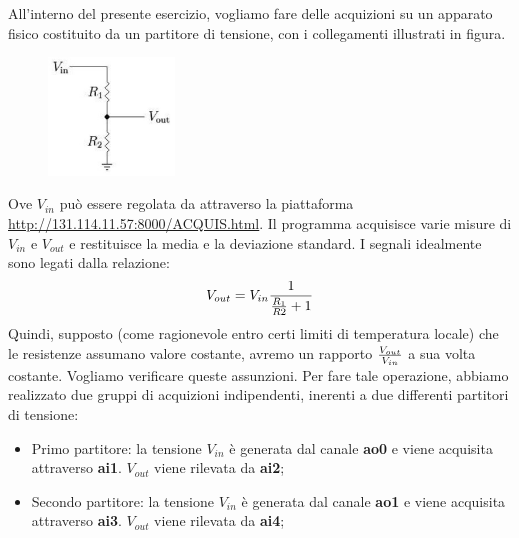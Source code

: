 All'interno del presente esercizio, vogliamo fare delle acquizioni su un apparato fisico costituito da un partitore di tensione, con i collegamenti illustrati in figura.
\begin{figure}
  \caption{}
    \includegraphics[width=0.3\textwidth]{settimana_1/immagini/partitore.jpg}
\end{figure}
Ove $V_{in}$ può essere regolata da  attraverso la piattaforma \textcolor{airforceblue}{\url{http://131.114.11.57:8000/ACQUIS.html}}. Il programma acquisisce varie misure di $V_{in}$ e $V_{out}$ e restituisce la media e la deviazione standard. I segnali idealmente sono legati dalla relazione:
\begin{equation}
    V_{out} = V_{in} {1 \over{{R_1\over{R2}} + 1}}
\label{eq1.2}
\end{equation} 
Quindi, supposto (come ragionevole entro certi limiti di temperatura locale) che le resistenze assumano valore costante, avremo un rapporto $V_{out} \over{V_{in}}$ a sua volta costante. Vogliamo verificare queste assunzioni. Per fare tale operazione, abbiamo realizzato due gruppi di acquizioni indipendenti, inerenti a due differenti partitori di tensione:
\begin{itemize}
    \item Primo partitore: la tensione  $V_{in}$ è generata dal canale \textbf{ao0} e viene acquisita attraverso \textbf{ai1}. $V_{out}$ viene rilevata da \textbf{ai2};
    \item Secondo partitore: la tensione  $V_{in}$ è generata dal canale \textbf{ao1} e viene acquisita attraverso \textbf{ai3}. $V_{out}$ viene rilevata da \textbf{ai4};
\end{itemize}

